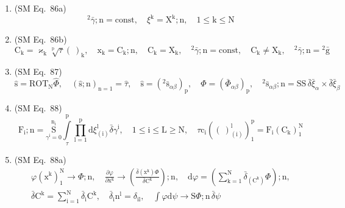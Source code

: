 \documentclass[12pt]{article}
\begin{document}
\begin{enumerate}[label=(\arabic*), series=formellist]
    \item (SM Eq.\ 86a) 
    \[
    {}^2\bar{\gamma};\mathrm{n} = \mathrm{const}, \quad \xi^\mathrm{k} = \mathrm{X^k};\mathrm{n}, \quad 1 \le \mathrm{k} \le \mathrm{N}
    \]

    \item (SM Eq.\ 86b) 
    \[
    \mathrm{C_k} = \varkappa_\mathrm{k} \sqrt[\mathrm{p}]{\tau} (\ )_\mathrm{k}, \quad \mathrm{x_k} = \mathrm{C_k};\mathrm{n}, \quad \mathrm{C_k} = \mathrm{X_k}, \quad {}^2\bar{\gamma};\mathrm{n} = \mathrm{const}, \quad \mathrm{C_k} \ne \mathrm{X_k}, \quad {}^2\bar{\gamma};\mathrm{n} = {}^2\bar{\mathrm{g}}
    \]

    \item (SM Eq.\ 87) 
    \[
    \hat{\mathrm{s}} = \mathrm{ROT}_\mathrm{N} \widehat{\Phi}, \quad (\hat{\mathrm{s}};\mathrm{n})_{\mathrm{n=1}} = \hat{\tau}, \quad \hat{\mathrm{s}} = \left({}^2\bar{\mathrm{s}}_{\alpha\beta}\right)_\mathrm{p}, \quad \widehat{\Phi} = \left( \bar{\Phi}_{\alpha\beta} \right)_\mathrm{p}, \quad {}^2\bar{\mathrm{s}}_{\alpha\beta};\mathrm{n} = \mathrm{SS}\,\bar{\delta}\bar{\xi}_\alpha \times \bar{\delta}\bar{\xi}_\beta
    \]

    \item (SM Eq.\ 88) 
    \[
    \mathrm{F_i};\mathrm{n} = \underset{\gamma^\mathrm{i}=0}{\overset{\mathrm{n_i}}{\mathrm{S}}} \int\limits_\tau^\mathrm{p} \prod_{\mathrm{l}=1}^\mathrm{p} \mathrm{d}\xi^\mathrm{l}_{(\mathrm{i})} \bar{\delta}\gamma^\mathrm{i}, \quad 1 \le \mathrm{i} \le \mathrm{L} \ge \mathrm{N}, \quad \tau \mathrm{c_i} \left( (\ )^\mathrm{l}_{(\mathrm{i})} \right)_1^\mathrm{p} = \mathrm{F_i}(\mathrm{C_k})_1^\mathrm{N}
    \]

    \item (SM Eq.\ 88a) 
    \[
    \begin{gathered}
    \varphi(\mathrm{x^k})_1^\mathrm{N} \to \Phi;\mathrm{n}, \quad \frac{\partial\varphi}{\partial \mathrm{x^k}} \to \left( \frac{\bar{\delta}\left(\mathrm{x^k}\right)\Phi}{\bar{\delta}\mathrm{C^k}} \right);\mathrm{n}, \quad \mathrm{d}\varphi = \left( \sum_{\mathrm{k}=1}^\mathrm{N} \bar{\delta}_{(\mathrm{C^k})} \Phi \right);\mathrm{n}, \\
    \bar{\delta}\mathrm{C^k} = \sum_{\mathrm{i}=1}^\mathrm{N} \bar{\delta}_\mathrm{i} \mathrm{C^k}, \quad \bar{\delta}_\mathrm{i} \mathrm{n^l} = \delta_{\mathrm{il}}, \quad \int \varphi \mathrm{d}\psi \to \mathrm{S}\Phi;\mathrm{n}\,\bar{\delta}\psi
    \end{gathered}
    \]


\end{enumerate}
\end{document}
